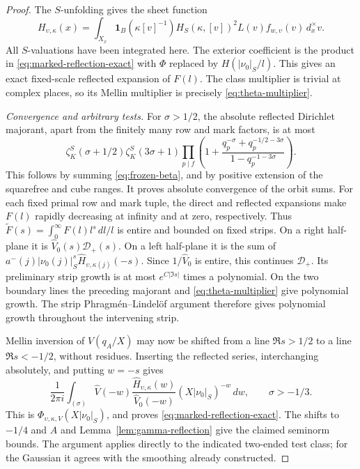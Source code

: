 \documentclass[11pt,a4paper]{article}
\numberwithin{equation}{section}
\theoremstyle{definition}
\theoremstyle{remark}
\newcommand{\ind}{\mathbf 1}
\begin{document}
\begin{proof}
The $S$-unfolding gives the sheet function
\begin{equation}\label{eq:marked-H-explicit}
 H_{\upsilon,\kappa}(x)=
  \int_{X_x}\ind_B(\kappa[v]^{-1})H_S(\kappa,[v])^2
                 L(v) f_{w,\upsilon}(v)\,d_x^\times v.
\end{equation}
All $S$-valuations have been integrated here.  The exterior coefficient
is the product in \eqref{eq:marked-reflection-exact} with
$\Phi$ replaced by $H(|\nu_0|_S/l)$.
This gives an exact fixed-scale reflected expansion of $F(l)$.
The class multiplier is trivial at complex places, so its Mellin
multiplier is precisely \eqref{eq:theta-multiplier}.

\emph{Convergence and arbitrary tests.}
For $\sigma>1/2$, the absolute reflected Dirichlet majorant, apart
from the finitely many row and mark factors, is at most
\begin{equation}\label{eq:marked-dirichlet-majorant}
 \zeta_K^S(\sigma+1/2)\zeta_K^S(3\sigma+1)
 \prod_{p\mid f}\left(1+
       \frac{q_p^{-\sigma}+q_p^{-1/2-3\sigma}}
            {1-q_p^{-1-3\sigma}}\right).
\end{equation}
This follows by summing \eqref{eq:frozen-beta}, and by positive
extension of the squarefree and cube ranges.  It proves absolute convergence of the orbit sums.
For each fixed primal row and mark tuple, the direct and reflected
expansions make $F(l)$ rapidly decreasing at infinity and at zero,
respectively.  Thus $\widetilde F(s)=\int_0^\infty F(l)l^s\,dl/l$
is entire and bounded on fixed strips.  On a right half-plane it is
$\widehat V_0(s)\mathcal D_+(s)$.  On a left half-plane it is the
sum of $a^-(j)|\nu_0(j)|_S^s\widehat H_{\upsilon,\kappa(j)}(-s)$.
Since $1/\widehat V_0$ is entire, this continues $\mathcal D_+$.
Its preliminary strip growth is at most $e^{C|\Im s|}$ times a
polynomial.  On the two boundary lines the preceding majorant and
\eqref{eq:theta-multiplier} give polynomial growth.  The strip
Phragm\'en--Lindel\"of argument therefore gives polynomial growth
throughout the intervening strip.

Mellin inversion of $V(q_A/X)$ may now be shifted from a line
$\Re s>1/2$ to a line $\Re s<-1/2$, without residues.
Inserting the reflected series, interchanging absolutely, and putting
$w=-s$ gives
\[
 \frac1{2\pi i}\int_{(\sigma)}
   \widehat V(-w)\frac{\widehat H_{\upsilon,\kappa}(w)}
                           {\widehat V_0(-w)}
      (X|\nu_0|_S)^{-w}\,dw,
 \qquad \sigma>-1/3.
\]
This is $\Phi_{\upsilon,\kappa,V}(X|\nu_0|_S)$, and proves
\eqref{eq:marked-reflection-exact}.  The shifts to $-1/4$ and $A$
and Lemma~\ref{lem:gamma-reflection} give the claimed seminorm bounds.
The argument applies directly to the indicated two-ended test class;
for the Gaussian it agrees with the smoothing already constructed.
\end{proof}
\end{document}
